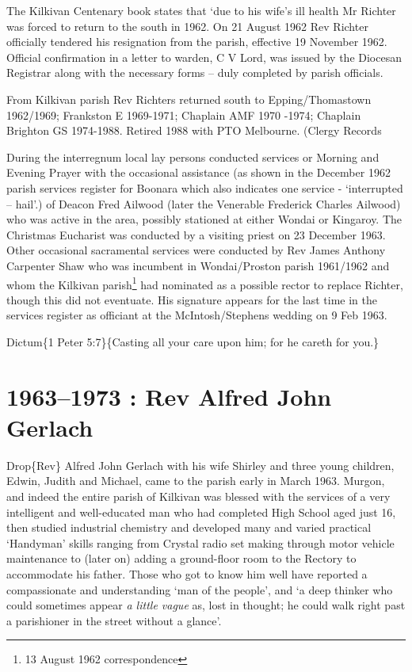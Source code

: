 The Kilkivan Centenary book states that `due to his wife's ill health Mr Richter was forced to return to the south in 1962. On 21 August 1962 Rev Richter officially tendered his resignation from the parish, effective 19 November 1962. Official confirmation in a letter to warden, C V Lord, was issued by the Diocesan Registrar along with the necessary forms -- duly completed by parish officials.

From Kilkivan parish Rev Richters returned south to Epping/Thomastown 1962/1969; Frankston E 1969-1971; Chaplain AMF 1970 -1974; Chaplain Brighton GS 1974-1988. Retired 1988 with PTO Melbourne. (Clergy Records

During the interregnum local lay persons conducted services or Morning and Evening Prayer with the occasional assistance (as shown in the December 1962 parish services register for Boonara which also indicates one service - `interrupted -- hail'.) of Deacon Fred Ailwood (later the Venerable Frederick Charles Ailwood) who was active in the area, possibly stationed at either Wondai or Kingaroy. The Christmas Eucharist was conducted by a visiting priest on 23 December 1963. Other occasional sacramental services were conducted by Rev James Anthony Carpenter Shaw who was incumbent in Wondai/Proston parish 1961/1962 and whom the Kilkivan parish\footnote{13 August 1962 correspondence} had nominated as a possible rector to replace Richter, though this did not eventuate. His signature appears for the last time in the services register as officiant at the McIntosh/Stephens wedding on 9 Feb 1963.

Dictum\{1 Peter 5:7\}\{Casting all your care upon him; for he careth for you.\}

\hypertarget{rev-alfred-john-gerlach}{%
\chapter{1963--1973 : Rev Alfred John Gerlach}\label{rev-alfred-john-gerlach}}

Drop\{Rev\} Alfred John Gerlach with his wife Shirley and three young children, Edwin, Judith and Michael, came to the parish early in March 1963. Murgon, and indeed the entire parish of Kilkivan was blessed with the services of a very intelligent and well-educated man who had completed High School aged just 16, then studied industrial chemistry and developed many and varied practical `Handyman' skills ranging from Crystal radio set making through motor vehicle maintenance to (later on) adding a ground-floor room to the Rectory to accommodate his father. Those who got to know him well have reported a compassionate and understanding `man of the people', and `a deep thinker who could sometimes appear \emph{a little vague} as, lost in thought; he could walk right past a parishioner in the street without a glance'.

